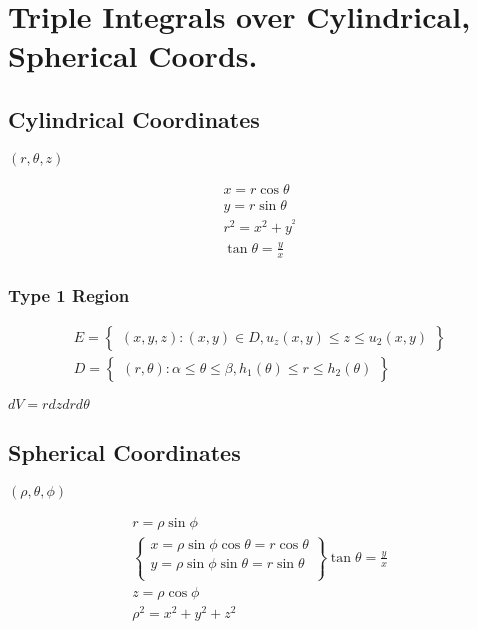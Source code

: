 \documentclass[12pt]{article}
\begin{document}
\section{Triple Integrals over Cylindrical, Spherical Coords.}
\subsection{Cylindrical Coordinates}
\((r,\theta,z)\)

\begin{minipage}{64pt}
	\begin{align*}
		x = r\cos \theta \\
		y = r \sin \theta \\
		r^{2} = x^{2} + y^{^2} \\
		\tan \theta = \frac{y}{x}
	\end{align*}
\end{minipage}

\subsubsection{Type 1 Region}
\begin{align*}
	E = \begin{Bmatrix}
		(x,y,z):(x,y) \in D, u_z(x,y) \leq z \leq u_2(x,y)
	\end{Bmatrix} \\
	D =  \begin{Bmatrix}
		(r,\theta):\alpha \leq \theta \leq \beta, h_1(\theta) \leq r \leq h_2(\theta)
	\end{Bmatrix}
\end{align*}

\(dV = rdzdrd\theta\)

\subsection{Spherical Coordinates}
\((\rho, \theta, \phi)\)

\begin{align*}
	r = \rho \sin \phi \\
	\begin{Bmatrix}
		x = \rho \sin \phi \cos \theta = r \cos \theta \\
		y = \rho \sin \phi \sin \theta  = r \sin \theta \\
	\end{Bmatrix} 
	\tan \theta = \frac{y}{x} \\
	z = \rho \cos \phi \\
	\rho ^{2} = x^{2} + y^{2} + z^{2}
\end{align*}
\end{document}
